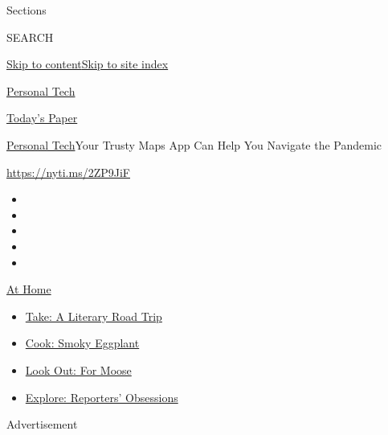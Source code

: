 Sections

SEARCH

\protect\hyperlink{site-content}{Skip to
content}\protect\hyperlink{site-index}{Skip to site index}

\href{https://www.nytimes.com/section/technology/personaltech}{Personal
Tech}

\href{https://myaccount.nytimes.com/auth/login?response_type=cookie\&client_id=vi}{}

\href{https://www.nytimes.com/section/todayspaper}{Today's Paper}

\href{/section/technology/personaltech}{Personal Tech}\textbar{}Your
Trusty Maps App Can Help You Navigate the Pandemic

\url{https://nyti.ms/2ZP9JiF}

\begin{itemize}
\item
\item
\item
\item
\item
\end{itemize}

\href{https://www.nytimes.com/spotlight/at-home?action=click\&pgtype=Article\&state=default\&region=TOP_BANNER\&context=at_home_menu}{At
Home}

\begin{itemize}
\tightlist
\item
  \href{https://www.nytimes.com/2020/07/28/books/time-for-a-literary-road-trip.html?action=click\&pgtype=Article\&state=default\&region=TOP_BANNER\&context=at_home_menu}{Take:
  A Literary Road Trip}
\item
  \href{https://www.nytimes.com/2020/07/29/magazine/bored-with-your-home-cooking-some-smoky-eggplant-will-fix-that.html?action=click\&pgtype=Article\&state=default\&region=TOP_BANNER\&context=at_home_menu}{Cook:
  Smoky Eggplant}
\item
  \href{https://www.nytimes.com/2020/07/27/travel/moose-michigan-isle-royale.html?action=click\&pgtype=Article\&state=default\&region=TOP_BANNER\&context=at_home_menu}{Look
  Out: For Moose}
\item
  \href{https://www.nytimes.com/interactive/2020/at-home/even-more-reporters-editors-diaries-lists-recommendations.html?action=click\&pgtype=Article\&state=default\&region=TOP_BANNER\&context=at_home_menu}{Explore:
  Reporters' Obsessions}
\end{itemize}

Advertisement

